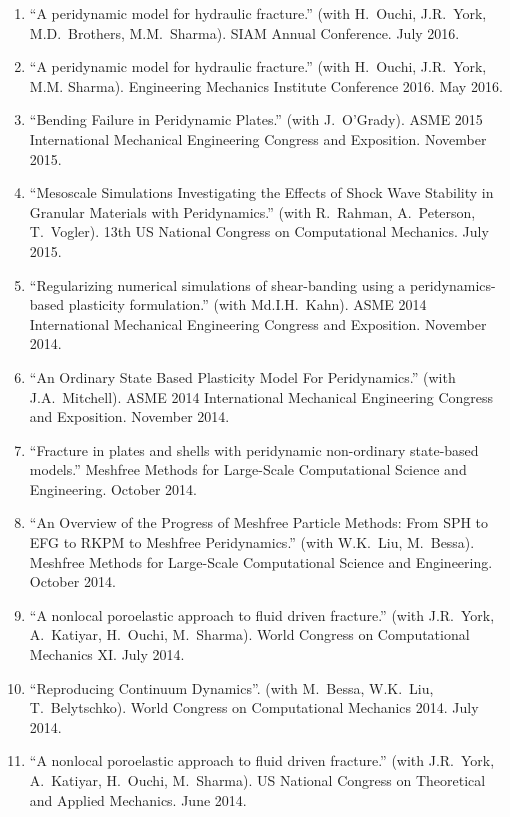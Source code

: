 \else
\ifdefined\ispdf
\begin{etaremune}
\else
\begin{enumerate}
\fi
    \item ``A peridynamic model for hydraulic fracture.'' (with H.\ Ouchi, J.R.\ York, M.D.\ Brothers, M.M.\ Sharma). SIAM Annual Conference.  July 2016.
    \item ``A peridynamic model for hydraulic fracture.'' (with H.\ Ouchi, J.R.\ York, M.M. Sharma). Engineering Mechanics Institute Conference 2016. May 2016.
    \item ``Bending Failure in Peridynamic Plates.'' (with J.~O'Grady). ASME 2015 International Mechanical Engineering Congress and Exposition. November 2015.
    \item ``Mesoscale Simulations Investigating the Effects of Shock Wave Stability in Granular Materials with Peridynamics.'' (with R.~Rahman, A.~Peterson, T.~Vogler). 13th US National Congress on Computational Mechanics. July 2015.
    \item ``Regularizing numerical simulations of shear-banding using a peridynamics-based plasticity formulation.'' (with Md.I.H.~Kahn). ASME 2014 International Mechanical Engineering Congress and Exposition. November 2014.
    \item ``An Ordinary State Based Plasticity Model For Peridynamics.'' (with J.A.~Mitchell). ASME 2014 International Mechanical Engineering Congress and Exposition. November 2014.
    \item ``Fracture in plates and shells with peridynamic non-ordinary state-based models.''  Meshfree Methods for Large-Scale Computational Science and Engineering. October 2014.
    \item ``An Overview of the Progress of Meshfree Particle Methods: From SPH to EFG to RKPM to Meshfree Peridynamics.'' (with W.K.~Liu, M.~Bessa). Meshfree Methods for Large-Scale Computational Science and Engineering. October 2014.
    \item ``A nonlocal poroelastic approach to fluid driven fracture.'' (with J.R.~York, A.~Katiyar, H.~Ouchi, M.~Sharma). World Congress on Computational Mechanics XI.  July 2014.
    \item ``Reproducing Continuum Dynamics''. (with M.~Bessa, W.K.~Liu, T.~Belytschko). World Congress on Computational Mechanics 2014.  July 2014.
    \item ``A nonlocal poroelastic approach to fluid driven fracture.'' (with J.R.~York, A.~Katiyar, H.~Ouchi, M.~Sharma). US National Congress on Theoretical and Applied Mechanics.  June 2014.

\end{enumerate}
\end{etaremune}
